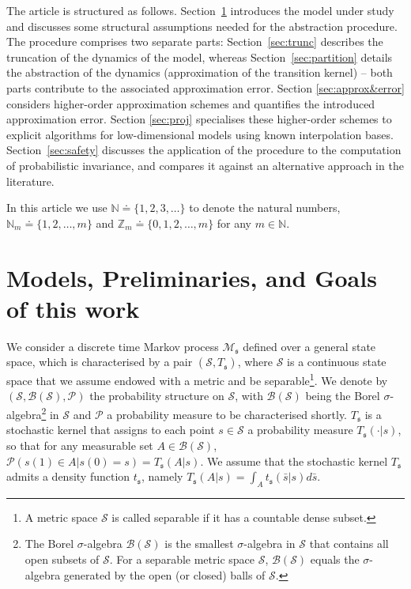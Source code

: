 \documentclass{LMCS}
\begin{document}
The article is structured as follows. 
Section~\ref{sec:prelim} introduces the model under study and discusses some structural assumptions needed for the abstraction procedure. 
The procedure comprises two separate parts:
Section~\ref{sec:trunc} describes the truncation of the dynamics of the model, 
whereas Section~\ref{sec:partition} details the abstraction of the dynamics (approximation of the transition kernel) -- 
both parts contribute to the associated approximation error. 
Section \ref{sec:approx&error} considers higher-order approximation schemes and quantifies
the introduced approximation error. Section \ref{sec:proj} specialises 
these higher-order schemes to explicit algorithms for low-dimensional models using known interpolation bases. 
Section~\ref{sec:safety} discusses the application of the procedure to the computation of probabilistic invariance, 
and compares it against an alternative approach in the literature.

\smallskip

In this article we use $\mathbb N \doteq \{1,2,3,\ldots\}$ to denote the natural numbers,
$\mathbb N_m\doteq \{1,2,\ldots,m\}$ and $\mathbb Z_m\doteq \{0,1,2,\ldots,m\}$
for any $m\in\mathbb N$.

\section{Models, Preliminaries, and Goals of this work}
\label{sec:prelim}

We consider a discrete time Markov process $\mathscr M_{\mathfrak s}$ defined over a general state space, 
which is characterised by a pair $(\mathcal S, T_{\mathfrak s})$,
where $\mathcal S$ is a continuous state space that we assume endowed with a metric and be separable\footnote{A metric space $\mathcal S$ is called separable if it has a countable dense subset.}.
We denote by $(\mathcal S,\mathcal B(\mathcal S),\mathcal P)$ the probability structure on $\mathcal S$,
with $\mathcal B(\mathcal S)$ being the Borel $\sigma$-algebra\footnote{The Borel $\sigma$-algebra $\mathcal B(\mathcal S)$ is the smallest $\sigma$-algebra in $\mathcal S$ that contains all open subsets of $\mathcal S$. For a separable metric space $\mathcal S$, $\mathcal B(\mathcal S)$ equals the $\sigma$-algebra generated by the open (or closed) balls of $\mathcal S$.} 
in $\mathcal S$ and $\mathcal P$ a probability measure to be characterised shortly.  
$T_{\mathfrak s}$ is a stochastic kernel that assigns to each point $s\in\mathcal S$ a probability measure $T_{\mathfrak s}(\cdot|s)$, 
so that for any measurable set $A\in\mathcal B(\mathcal S)$, 
$\mathcal P(s(1) \in A|s(0) = s) = T_{\mathfrak s}(A|s)$. 
We assume that the stochastic kernel $T_{\mathfrak s}$ admits a density function $t_{\mathfrak s}$,
namely $T_{\mathfrak s}(A|s) = \int_A t_{\mathfrak s}(\bar s|s)d\bar s$.  
\end{document}
